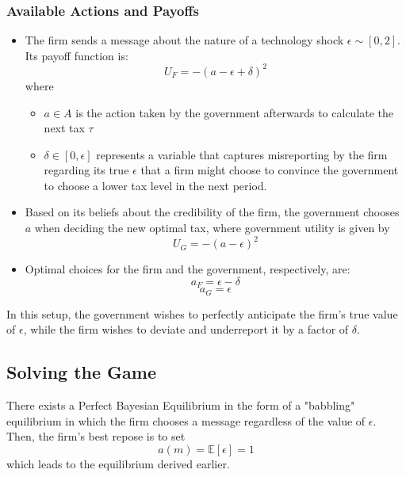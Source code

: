 \documentclass{article}
\begin{document}
\subsubsection{Available Actions and Payoffs}

\begin{itemize}
\item The firm sends a message about the nature of a technology shock $\epsilon \sim [0,2]$. 
    Its payoff function is:
    \begin{equation}
    U_F = - (a - \epsilon + \delta)^2
    \end{equation}
where 
\begin{itemize}
    \item $a \in A$ is the action taken by the government afterwards to calculate the next tax $\tau$  
    \item $\delta \in [0, \epsilon]$ represents a variable that captures misreporting by the firm regarding its true $\epsilon$ that a firm might choose to convince the government to choose a lower tax level in the next period.
\end{itemize}

\item Based on its beliefs about the credibility of the firm, the government chooses $a$ when deciding the new optimal tax, where government utility is given by
\begin{equation}
    U_G = - (a - \epsilon)^2
\end{equation}
\item Optimal choices for the firm and the government, respectively, are:
    \begin{equation*}
        a_F = \epsilon - \delta
    \end{equation*} 
    \begin{equation*}
        a_G = \epsilon
    \end{equation*}
\end{itemize}
In this setup, the government wishes to perfectly anticipate the firm's true value of $\epsilon$, while the firm wishes to deviate and underreport it by a factor of $\delta$.

\subsection{Solving the Game}

\begin{proposition}
    There exists a Perfect Bayesian Equilibrium in the form of a "babbling" equilibrium in which the firm chooses a message regardless of the value of $\epsilon$. Then, the firm's best repose is to set 
    \begin{equation*}
        a(m) = \mathbb{E}[\epsilon] = 1
    \end{equation*}
    which leads to the equilibrium derived earlier.
\end{proposition}
\end{document}

